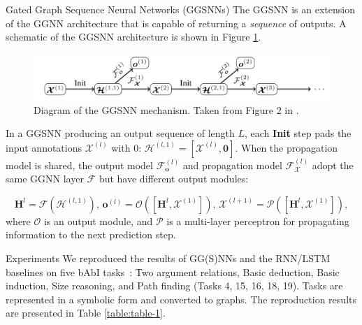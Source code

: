 \documentclass[final,hyperref={pdfpagelabels=false}]{beamer}
\begin{document}
\begin{frame}[t]
\begin{columns}[t]
\begin{column}{.3\textwidth}
    \color{oxfordblue}
    
    
    \begin{block}{Gated Graph Sequence Neural Networks (GGSNNs)}
     The GGSNN is an extension of the GGNN architecture that is capable of returning a \textit{sequence} of outputs. A schematic of the GGSNN architecture is shown in Figure \ref{fig:GGSNN}.

    \begin{figure}
        \centering
        \includegraphics[width=\textwidth]{imgs/ggsnn.png}
        \caption{Diagram of the GGSNN mechanism. Taken from Figure 2 in \cite{DBLP:journals/corr/LiTBZ15}.}
        \label{fig:GGSNN}
    \end{figure}
    In a GGSNN 
    producing an output sequence of length $L$, each \textbf{Init} step pads the input annotations $\boldsymbol{\mathcal{X}}^{(l)}$ with 0: $\boldsymbol{\mathcal{H}}^{(l, 1)} = [\boldsymbol{\mathcal{X}}^{(l)}, \boldsymbol{0}]$.
    When the propagation model is shared, the output model $\mathcal{F}_{\mathbf o}^{(l)}$ and propagation model $\mathcal{F}_{\boldsymbol{\mathcal{X}}}^{(l)}$ adopt the same GGNN layer $\mathcal{F}$ but have different output modules:
    
    \begin{equation}
        \mathbf{H}^l = \boldsymbol{\mathcal{F}}\left(\boldsymbol{\mathcal{H}}^{(l, 1)}\right),\, \boldsymbol{o}^{(l)} = 
        \boldsymbol{\mathcal{O}} \left([\mathbf{H}^l, \boldsymbol{\mathcal{X}}^{(1)}]\right),\, 
        \boldsymbol{\mathcal{X}}^{(l+1)} = \boldsymbol{\mathcal{P}}\left([\mathbf{H}^l, \boldsymbol{\mathcal{X}}^{(1)}]\right),
    \end{equation}
    where $\boldsymbol{\mathcal{O}}$ is an output module, and $\boldsymbol{\mathcal{P}}$ is a multi-layer perceptron for propagating information to the next prediction step.
    \end{block}
    \vspace{-0.6in} 
    \begin{block}{Experiments}
      We reproduced the results of GG(S)NNs and the RNN/LSTM baselines on five bAbI tasks~\cite{DBLP:journals/corr/WestonBCM15}: Two argument relations, Basic deduction, Basic induction, Size reasoning, and Path finding (Tasks 4, 15, 16, 18, 19). Tasks are represented in a symbolic form and converted to graphs. The reproduction results are presented in Table \ref{table:table-1}.\vspace{0.1in}
      

\end{block}
\end{column}
\end{columns}
\end{frame}
\end{document}
